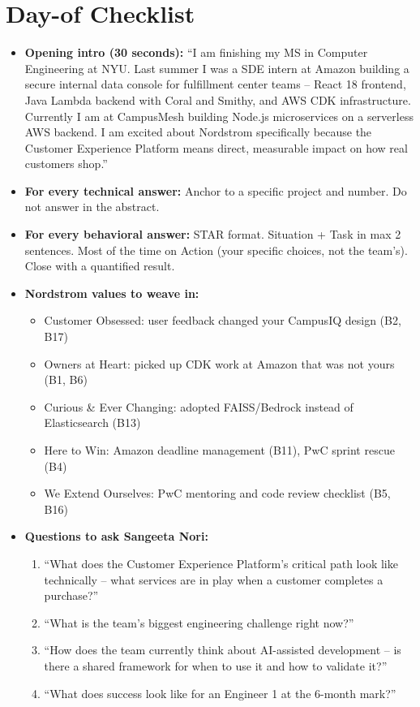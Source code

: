 \documentclass[letterpaper,10pt]{article}
\begin{document}
\section{Day-of Checklist}

\begin{itemize}[leftmargin=*, itemsep=4pt]
  \item \textbf{Opening intro (30 seconds):} ``I am finishing my MS in Computer Engineering at NYU. Last summer I was a SDE intern at Amazon building a secure internal data console for fulfillment center teams -- React 18 frontend, Java Lambda backend with Coral and Smithy, and AWS CDK infrastructure. Currently I am at CampusMesh building Node.js microservices on a serverless AWS backend. I am excited about Nordstrom specifically because the Customer Experience Platform means direct, measurable impact on how real customers shop.''

  \item \textbf{For every technical answer:} Anchor to a specific project and number. Do not answer in the abstract.

  \item \textbf{For every behavioral answer:} STAR format. Situation + Task in max 2 sentences. Most of the time on Action (your specific choices, not the team's). Close with a quantified result.

  \item \textbf{Nordstrom values to weave in:}
    \begin{itemize}[itemsep=0pt]
      \item Customer Obsessed: user feedback changed your CampusIQ design (B2, B17)
      \item Owners at Heart: picked up CDK work at Amazon that was not yours (B1, B6)
      \item Curious \& Ever Changing: adopted FAISS/Bedrock instead of Elasticsearch (B13)
      \item Here to Win: Amazon deadline management (B11), PwC sprint rescue (B4)
      \item We Extend Ourselves: PwC mentoring and code review checklist (B5, B16)
    \end{itemize}

  \item \textbf{Questions to ask Sangeeta Nori:}
    \begin{enumerate}[itemsep=0pt]
      \item ``What does the Customer Experience Platform's critical path look like technically -- what services are in play when a customer completes a purchase?''
      \item ``What is the team's biggest engineering challenge right now?''
      \item ``How does the team currently think about AI-assisted development -- is there a shared framework for when to use it and how to validate it?''
      \item ``What does success look like for an Engineer 1 at the 6-month mark?''
    \end{enumerate}


\end{itemize}
\end{document}
